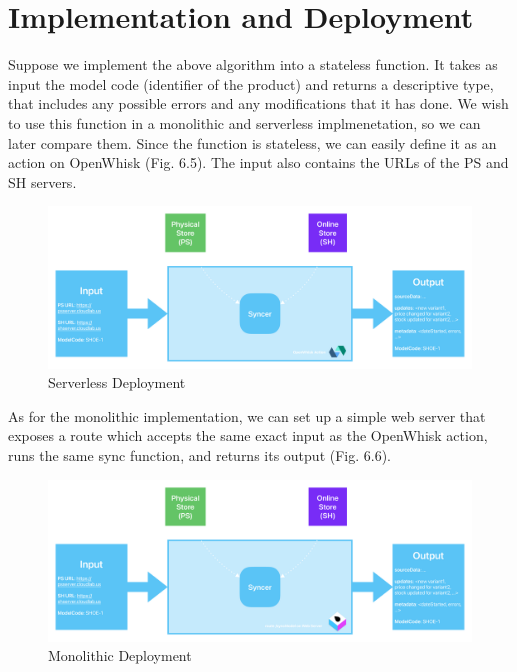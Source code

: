 \section{Implementation and Deployment}
Suppose we implement the above algorithm into a stateless function. It takes as input the model code (identifier of the product) and returns a descriptive type, that includes any possible errors and any modifications that it has done. We wish to use this function in a monolithic and serverless implmenetation, so we can later compare them. Since the function is stateless, we can easily define it as an action on OpenWhisk (Fig. 6.5). The input also contains the URLs of the PS and SH servers.
\begin{figure}[h!]
    \centering
    \includegraphics[width=\textwidth]{media/syncModelAction.pdf}
    \caption{Serverless Deployment}
    \label{fig:sync3_5}
\end{figure}
As for the monolithic implementation, we can set up a simple web server that exposes a route which accepts the same exact input as the OpenWhisk action, runs the same sync function, and returns its output (Fig. 6.6).
\begin{figure}[h!]
    \centering
    \includegraphics[width=\textwidth]{media/syncModelMonolithic.pdf}
    \caption{Monolithic Deployment}
    \label{fig:sync3_5}
\end{figure}


